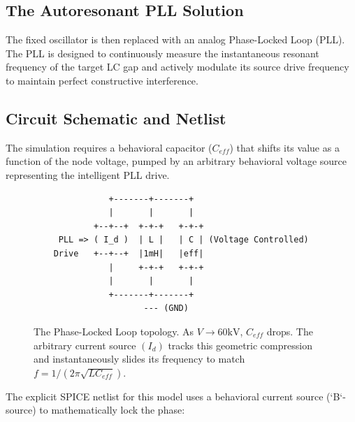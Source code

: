 \subsection{The Autoresonant PLL Solution}
The fixed oscillator is then replaced with an analog Phase-Locked Loop (PLL). The PLL is designed to continuously measure the instantaneous resonant frequency of the target LC gap and actively modulate its source drive frequency to maintain perfect constructive interference.

\subsection{Circuit Schematic and Netlist}
The simulation requires a behavioral capacitor ($C_{eff}$) that shifts its value as a function of the node voltage, pumped by an arbitrary behavioral voltage source representing the intelligent PLL drive.

\begin{figure}[h!]
    \centering
    \begin{tcolorbox}[colback=black!5!white, colframe=black!75!white, title=Simplified LTspice Equivalent Circuit]
    \centering
    \begin{verbatim}
               +-------+-------+
               |       |       |
            +--+--+  +-+-+   +-+-+
     PLL => ( I_d )  | L |   | C | (Voltage Controlled)
    Drive   +--+--+  |1mH|   |eff|
               |     +-+-+   +-+-+
               |       |       |
               +-------+-------+
                      --- (GND)
    \end{verbatim}
    \end{tcolorbox}
    \caption{The Phase-Locked Loop topology. As $V \to 60\text{kV}$, $C_{eff}$ drops. The arbitrary current source $(I_d)$ tracks this geometric compression and instantaneously slides its frequency to match $f = 1/(2\pi\sqrt{LC_{eff}})$.}
\end{figure}

The explicit SPICE netlist for this model uses a behavioral current source (`B`-source) to mathematically lock the phase:

